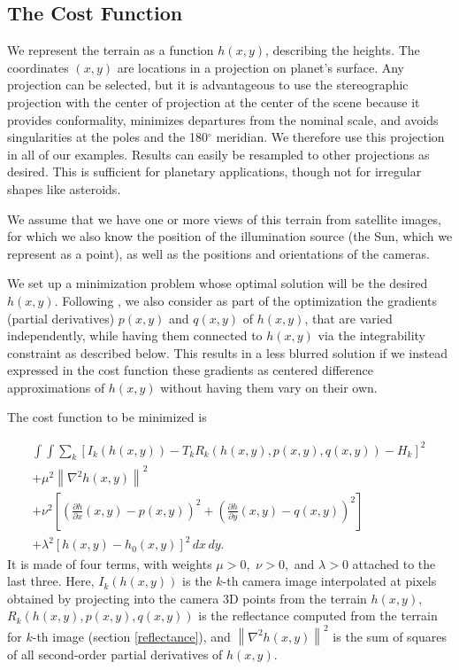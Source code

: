 \documentclass[draft,linenumbers]{agujournal}
\begin{document}
\subsection{The Cost Function}

We represent the terrain as a function $h(x,y)$, describing the
heights.  The coordinates $(x,y)$ are locations in a projection on planet's surface. Any projection can be selected, but it is advantageous to use the stereographic projection with the center of
projection at the center of the scene because it provides conformality, minimizes departures from the nominal scale, and avoids singularities at the poles and the 180$^{\circ}$ meridian.  We therefore use this projection in all of our examples.  Results can easily be resampled to other projections as desired.
This is sufficient for planetary applications,
though not for irregular shapes like asteroids. 

We assume that we
have one or more views of this terrain from satellite images, for
which we also know the position of the illumination source (the
Sun, which we represent as a point), as well as the positions and
orientations of the cameras. 

We set up a minimization problem whose optimal solution will be the desired $h(x,y).$
Following \citet{horn1990height}, we also consider as part of the optimization
the gradients (partial derivatives) $p(x,y)$ and $q(x, y)$ of $h(x, y)$,
that are varied independently, while having them connected to 
$h(x, y)$ via the integrability constraint as described below. This results in a less blurred 
solution if we instead expressed in the cost function these gradients as 
centered difference approximations of $h(x, y)$ without having them vary on their own. 

The cost function to be minimized is

\begin{eqnarray}\label{cost}
\int\!\! \int \! \sum_k \left[ I_k(h(x, y)) - T_k 
R_k(h(x, y), p(x, y), q(x,y)) - H_k \right]^2\, \nonumber \\             
+ \mu^2 \left\|\nabla^2 h(x, y) \right\|^2  \nonumber \\
+ \nu^2  
\left[ 
\left( \frac{\partial h}{\partial x}(x, y) - p(x, y)\right)^2  
+
\left( \frac{\partial h}{\partial y}(x, y) - q(x, y)\right)^2  
 \right] \nonumber \\
 + \lambda^2  \left[ h(x, y) - h_0(x, y) \right]^2
\, dx\, dy.
\end{eqnarray}
It is made of four terms, with weights $\mu > 0,$ $\nu>0,$ and $\lambda > 0$
attached to the last three. Here, $I_k(h(x, y))$ is the $k$-th camera image interpolated at
pixels obtained by projecting into the camera 3D points from the terrain
$h(x, y)$, $R_k(h(x, y), p(x, y), q(x,y))$ is the reflectance computed from the terrain for $k$-th image (section \ref{reflectance}), and $\left\|\nabla^2 h(x, y) \right\|^2 $ is the sum
of squares of all second-order partial derivatives of $h(x, y)$.
\end{document}
